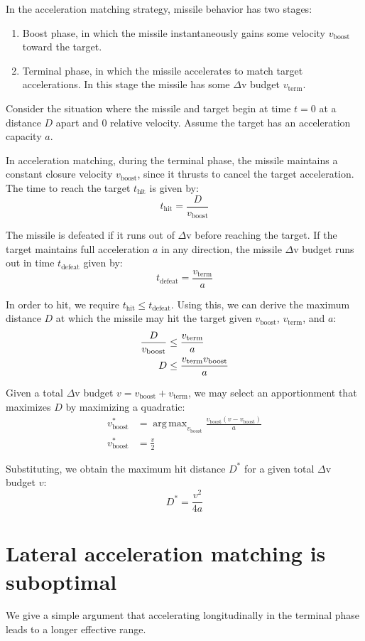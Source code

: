 \documentclass{article}
\DeclareMathOperator*{\argmax}{arg\,max}
\begin{document}
In the acceleration matching strategy, missile behavior has two stages:
\begin{enumerate}
\item Boost phase, in which the missile instantaneously gains some velocity
$v_\text{boost}$ toward the target.
\item Terminal phase, in which the missile accelerates to match target
accelerations. In this stage the missile has some $\Delta$v budget
$v_\text{term}$.
\end{enumerate}

Consider the situation where the missile and target begin at time $t = 0$ at a
distance $D$ apart and 0 relative velocity. Assume the target has an
acceleration capacity $a$.

In acceleration matching, during the terminal phase, the missile maintains a
constant closure velocity $v_\text{boost}$, since it thrusts to cancel the
target acceleration. The time to reach the target $t_\text{hit}$ is given by:
\begin{equation}
t_\text{hit} = \frac{D}{v_\text{boost}}
\end{equation}

The missile is defeated if it runs out of $\Delta$v before reaching the target.
If the target maintains full acceleration $a$ in any direction, the missile
$\Delta$v budget runs out in time $t_\text{defeat}$ given by:
\begin{equation}
t_\text{defeat} = \frac{v_\text{term}}{a}
\end{equation}

In order to hit, we require $t_\text{hit} \le t_\text{defeat}$. Using this, we
can derive the maximum distance $D$ at which the missile may hit the target
given $v_\text{boost}$, $v_\text{term}$, and $a$:
\begin{align}
\frac{D}{v_\text{boost}} &\le \frac{v_\text{term}}{a} \\ \notag
D &\le \frac{v_\text{term} v_\text{boost}}{a}
\end{align}

Given a total $\Delta$v budget $v = v_\text{boost} + v_\text{term}$, we may
select an apportionment that maximizes $D$ by maximizing a quadratic:
\begin{align}
v_\text{boost}^* &= \argmax_{v_\text{boost}}
    \frac{v_\text{boost} (v - v_\text{boost})}{a} \\
v_\text{boost}^* &= \frac{v}{2}
\end{align}

Substituting, we obtain the maximum hit distance $D^*$ for a given total
$\Delta$v budget $v$:
\begin{equation}
D^* = \frac{v^2}{4a}
\end{equation}

\section{Lateral acceleration matching is suboptimal}

We give a simple argument that accelerating longitudinally in the terminal phase
leads to a longer effective range.

\balance

\newpage


\end{document}
